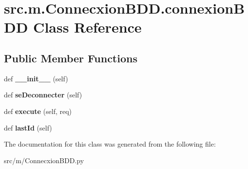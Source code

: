 \hypertarget{classsrc_1_1m_1_1_connecxion_b_d_d_1_1connexion_b_d_d}{}\section{src.\+m.\+Connecxion\+B\+D\+D.\+connexion\+B\+D\+D Class Reference}
\label{classsrc_1_1m_1_1_connecxion_b_d_d_1_1connexion_b_d_d}
\subsection*{Public Member Functions}
\begin{DoxyCompactItemize}
\item 
\hypertarget{classsrc_1_1m_1_1_connecxion_b_d_d_1_1connexion_b_d_d_a197dbcb9c8ee0ee2a450c6dbd952fde5}{}def {\bfseries \+\_\+\+\_\+init\+\_\+\+\_\+} (self)\label{classsrc_1_1m_1_1_connecxion_b_d_d_1_1connexion_b_d_d_a197dbcb9c8ee0ee2a450c6dbd952fde5}

\item 
\hypertarget{classsrc_1_1m_1_1_connecxion_b_d_d_1_1connexion_b_d_d_ac0b17bb790791ac516f4c7d0bf0c6bfc}{}def {\bfseries se\+Deconnecter} (self)\label{classsrc_1_1m_1_1_connecxion_b_d_d_1_1connexion_b_d_d_ac0b17bb790791ac516f4c7d0bf0c6bfc}

\item 
\hypertarget{classsrc_1_1m_1_1_connecxion_b_d_d_1_1connexion_b_d_d_a86084830d072033e07a29c6fa67aba51}{}def {\bfseries execute} (self, req)\label{classsrc_1_1m_1_1_connecxion_b_d_d_1_1connexion_b_d_d_a86084830d072033e07a29c6fa67aba51}

\item 
\hypertarget{classsrc_1_1m_1_1_connecxion_b_d_d_1_1connexion_b_d_d_a69cd872a2491151ed112582cf76d99d3}{}def {\bfseries last\+Id} (self)\label{classsrc_1_1m_1_1_connecxion_b_d_d_1_1connexion_b_d_d_a69cd872a2491151ed112582cf76d99d3}

\end{DoxyCompactItemize}


The documentation for this class was generated from the following file\+:\begin{DoxyCompactItemize}
\item 
src/m/Connecxion\+B\+D\+D.\+py\end{DoxyCompactItemize}
